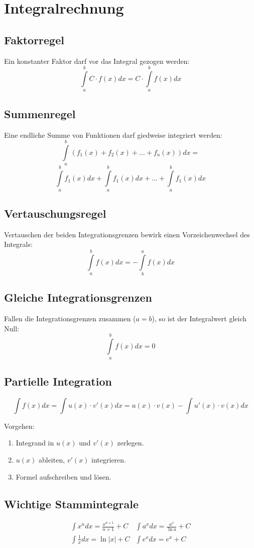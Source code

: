 \documentclass[10pt,a4paper,twocolumn]{article}
\begin{document}
\section{Integralrechnung}

\subsection{Faktorregel}
Ein konstanter Faktor darf vor das Integral gezogen werden:
\[
\int\limits_{a}^{b}C\cdot f(x)dx=C\cdot\int\limits_{a}^{b}f(x)dx
\]

\subsection{Summenregel}
Eine endliche Summe von Funktionen darf giedweise integriert werden:
\[
\int\limits_{a}^{b}\left(f_1(x)+f_2(x)+...+f_n(x)\right)dx=
\]
\[
\int\limits_{a}^{b}f_1(x)dx+\int\limits_{a}^{b}f_1(x)dx+...+\int\limits_{a}^{b}f_1(x)dx
\]

\subsection{Vertauschungsregel}
Vertauschen der beiden Integrationsgrenzen bewirk einen Vorzeichenwechsel des Integrals:
\[
\int\limits_{a}^{b}f(x)dx=-\int\limits_{b}^{a}f(x)dx
\]

\subsection{Gleiche Integrationsgrenzen}
Fallen die Integrationsgrenzen zusammen ($a=b$), so ist der Integralwert gleich Null:
\[
\int\limits_{a}^{b}f(x)dx=0
\]

\subsection{Partielle Integration}
\[
\int f(x)dx=\int u(x)\cdot v'(x)dx=u(x)\cdot v(x)-\int u'(x)\cdot v(x)dx
\]

Vorgehen:
\begin{enumerate}
\item Integrand in $u(x)$ und $v'(x)$ zerlegen.
\item $u(x)$ ableiten, $v'(x)$ integrieren.
\item Formel aufschreiben und lösen.
\end{enumerate}

\subsection{Wichtige Stammintegrale}
\renewcommand*{\arraystretch}{2}
\[
\begin{array}{cc}

	\int x^ndx=\frac{x^{n+1}}{n+1}+C & \int a^xdx=\frac{a^x}{\ln a}+C \\
	\int\frac{1}{x}dx=\ln |x|+C & \int e^xdx=e^x+C \\
\end{array}
\]
\renewcommand*{\arraystretch}{1}
\end{document}
